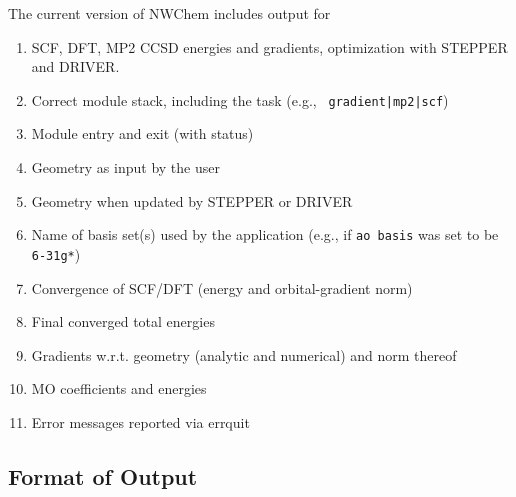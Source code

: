 The current version of NWChem includes output for
\begin{enumerate}
\item SCF, DFT, MP2 CCSD energies and gradients, optimization with STEPPER and DRIVER.
\item Correct module stack, including the task (e.g., {\tt
    gradient|mp2|scf})
\item Module entry and exit (with status)
\item Geometry as input by the user
\item Geometry when updated by STEPPER or DRIVER
\item Name of basis set(s) used by the application (e.g., if {\tt ao
    basis} was set to be \verb+6-31g*+)
\item Convergence of SCF/DFT (energy and orbital-gradient norm)
\item Final converged total energies
\item Gradients w.r.t. geometry (analytic and numerical) and norm thereof
\item MO coefficients and energies
\item Error messages reported via errquit
\end{enumerate}

\subsection{Format of Output}

